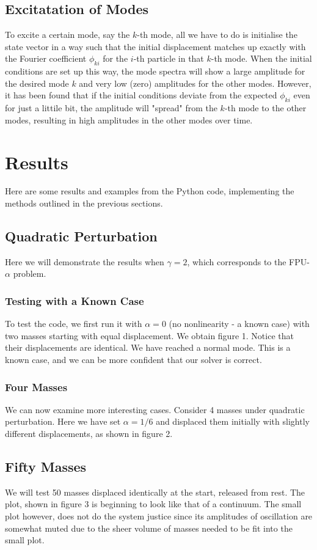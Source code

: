 \documentclass{article}
\begin{document}
\subsection{Excitatation of Modes}
To excite a certain mode, say the $k$-th mode, all we have to do is initialise the state vector 
in a way such that 
the initial displacement matches up exactly with the Fourier coefficient $\phi_{ki}$ for the 
$i$-th particle in that $k$-th mode. When the initial conditions are set up this way, the mode spectra 
will show a large amplitude for the desired mode $k$ and very low (zero) amplitudes for the other modes.
However, it has been found that if the initial conditions deviate from the expected $\phi_{ki}$ 
even for just a littile bit, the amplitude will "spread" from 
the $k$-th mode to the other modes, resulting in high amplitudes in the other modes over time.
\section{Results}
Here are some results and examples from the Python code, implementing the methods outlined in the previous sections.
\subsection{Quadratic Perturbation}
Here we will demonstrate the results when $\gamma=2$, which corresponds to the FPU-$\alpha$ problem.
\subsubsection{Testing with a Known Case}
To test the code, we first run it with $\alpha=0$ (no nonlinearity - a known case) with two masses 
starting with equal displacement. We obtain figure 1.
Notice that their displacements are identical. We have reached a normal mode. This is 
a known case, and we can be more confident that our solver is correct.
\subsubsection{Four Masses}
We can now examine more interesting cases. Consider 4 masses under quadratic perturbation. 
Here we have set $\alpha=1/6$ and displaced them initially with slightly different displacements, as shown in figure 2.
\subsection{Fifty Masses}
We will test 50 masses displaced identically at the start, released from rest. The plot, 
shown in figure 3 is beginning to look 
like that of a continuum. The small plot however, does not do the system justice since 
its amplitudes of oscillation are somewhat muted due to the sheer volume of masses needed 
to be fit into the small plot.
\end{document}
